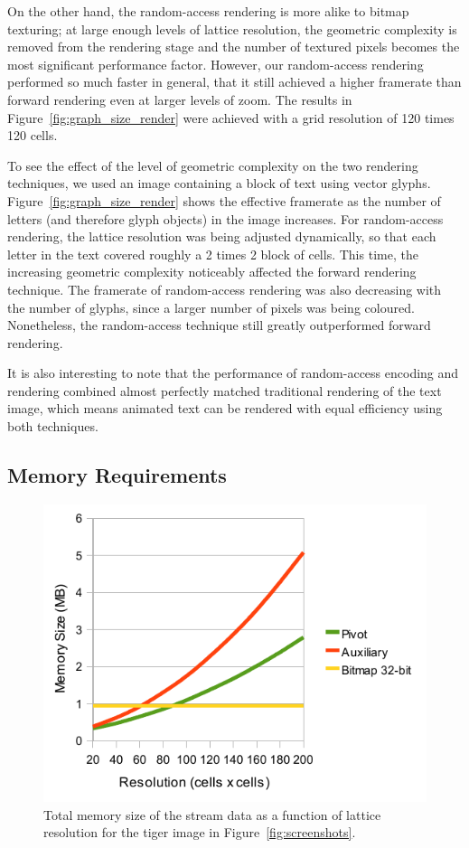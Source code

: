 \documentclass[11pt,a4paper,twoside]{article}
\begin{document}
On the other hand, the random-access rendering is more alike to bitmap texturing; at large enough levels of lattice resolution, the geometric complexity is removed from the rendering stage and the number of textured pixels becomes the most significant performance factor. However, our random-access rendering performed so much faster in general, that it still achieved a higher framerate than forward rendering even at larger levels of zoom. The results in Figure~\ref{fig:graph_size_render} were achieved with a grid resolution of 120 times 120 cells.

To see the effect of the level of geometric complexity on the two rendering techniques, we used an image containing a block of text using vector glyphs. Figure~\ref{fig:graph_size_render} shows the effective framerate as the number of letters (and therefore glyph objects) in the image increases. For random-access rendering, the lattice resolution was being adjusted dynamically, so that each letter in the text covered roughly a 2 times 2 block of cells. This time, the increasing geometric complexity noticeably affected the forward rendering technique. The framerate of random-access rendering was also decreasing with the number of glyphs, since a larger number of pixels was being coloured. Nonetheless, the random-access technique still greatly outperformed forward rendering.

It is also interesting to note that the performance of random-access encoding and rendering combined almost perfectly matched traditional rendering of the text image, which means animated text can be rendered with equal efficiency using both techniques.

\subsection {Memory Requirements}

\begin {figure} [h]
	\centering
	\includegraphics[width=0.55\columnwidth] {figures/graph_grid_memory}
	\caption {Total memory size of the stream data as a function of lattice resolution for the tiger image in Figure~\ref{fig:screenshots}.}
	\label {fig:graph_grid_memory}
\end {figure}
\end{document}

